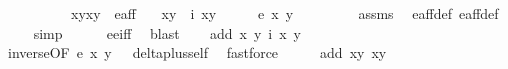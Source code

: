 \begin{isabellebody}
\ \ \ \ \ \ \ \ \ \ {\isachardoublequoteopen}{\isacharparenleft}{\isacharparenleft}x{}{\isacharcomma}y{}{\isacharparenright}{\isacharcomma}{\isacharparenleft}x{}{\isacharcomma}y{}{\isacharparenright}{\isacharparenright}\ {\isasymin}\ e{\isacharunderscore}aff{\isacharunderscore}{}{\isachardoublequoteclose}\isanewline
\ \ \ {\isachardoublequoteopen}{\isacharparenleft}x{}{\isacharcomma}y{}{\isacharparenright}\ {\isacharequal}\ i\ {\isacharparenleft}x{}{\isacharcomma}y{}{\isacharparenright}{\isachardoublequoteclose}\isanewline
%
\isadelimproof
%
\endisadelimproof
%
\isatagproof
{}\isamarkupfalse%
\ {\isacharminus}\isanewline
\ \ \isamarkupfalse%
\ {\isachardoublequoteopen}e\ x{}\ y{}\ {\isacharequal}\ {}{\isachardoublequoteclose}\ \isanewline
\ \ \ \ \isamarkupfalse%
\ assms{\isacharparenleft}{}{\isacharparenright}\ \isamarkupfalse%
\ e{\isacharunderscore}aff{\isacharunderscore}{}{\isacharunderscore}def\ e{\isacharunderscore}aff{\isacharunderscore}def\isanewline
\ \ \ \ \isamarkupfalse%
{\isacharparenleft}simp{\isacharparenright}\isanewline
\ \ \ \ \isamarkupfalse%
\ e{\isacharunderscore}e{\isacharprime}{\isacharunderscore}iff\ \isamarkupfalse%
\ blast\isanewline
\ \ \isamarkupfalse%
\ {\isachardoublequoteopen}add\ {\isacharparenleft}x{}{\isacharcomma}\ y{}{\isacharparenright}\ {\isacharparenleft}i\ {\isacharparenleft}x{}{\isacharcomma}\ y{}{\isacharparenright}{\isacharparenright}\ {\isacharequal}\ {\isacharparenleft}{}{\isacharcomma}{}{\isacharparenright}{\isachardoublequoteclose}\isanewline
\ \ \ \ \isamarkupfalse%
\ inverse{\isacharbrackleft}OF\ {\isacartoucheopen}e\ x{}\ y{}\ {\isacharequal}\ {}{\isacartoucheclose}\ delta{\isacharunderscore}plus{\isacharunderscore}self{\isacharbrackright}\ \isamarkupfalse%
\ fastforce\isanewline
\ \ \isamarkupfalse%
\ \isamarkupfalse%
\ {\isachardoublequoteopen}add\ {\isacharparenleft}x{}{\isacharcomma}y{}{\isacharparenright}\ {\isacharparenleft}x{}{\isacharcomma}y{}{\isacharparenright}\ {\isacharequal}\ {\isacharparenleft}{}{\isacharcomma}{}{\isacharparenright}{\isachardoublequoteclose}\ \isamarkupfalse%

\end{isabellebody}
